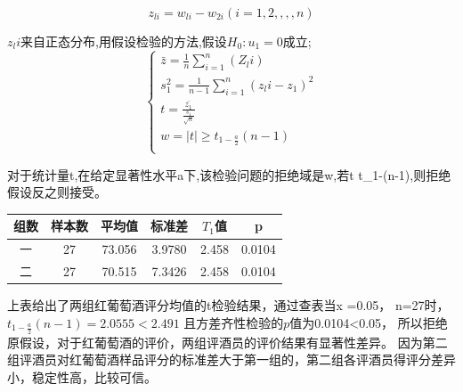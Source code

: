 \documentclass[UTF8]{ctexart}
\begin{document}
		\begin{equation}
			z_{li} = w_{li}-w_{2i}(i=1,2,,,,n)
		\end{equation}

		$z_li$来自正态分布,用假设检验的方法,假设$H_{0}:u_1=0$成立;
		\[\left\{\begin{array}{llcl}
				
					\bar{z}=\frac{1}{n}\sum_{i=1}^n(Z_li)\\
				
					s_{1}^2=\frac{1}{n-1}\sum_{i=1}^n(z_li-z_1)^2\\
				
					t=\frac{\bar{z_1}}{\frac{s_1}{\sqrt{n}}}\\
				
					w={\mid t \mid \ge t_{1-\frac{a}{2}}(n-1)}\\
				
				
			
			

	\end{array} \right.\]

		对于统计量t,在给定显著性水平a下,该检验问题的拒绝域是w,若{\mid t \mid \ge t_{1-}(n-1)},则拒绝假设反之则接受。

		\begin{center}
			\begin{tabular}{||c c c c c c||} 
			\hline
			组数 & 样本数 & 平均值 & 标准差 &$T_1$值 &p \\ [0.5ex] 
			\hline
			一 & 27 & 73.056 & 3.9780 & 2.458 & 0.0104\\ 
			\hline
			二 & 27 & 70.515 & 7.3426 & 2.458 & 0.0104 \\
			\hline
		   \end{tabular}
		   \end{center}

		   上表给出了两组红葡萄酒评分均值的t检验结果，通过查表当x =0.05， n=27时， $t_{1-\frac{a}{2}}(n-1)=2.0555<2.491$
		   且方差齐性检验的$p$值为0.0104<0.05，
		   所以拒绝原假设，对于红葡萄酒的评价，两组评酒员的评价结果有显著性差异。
		   因为第二组评酒员对红葡萄酒样品评分的标准差大于第一组的，第二组各评酒员得评分差异小，稳定性高，比较可信。
\end{document}
